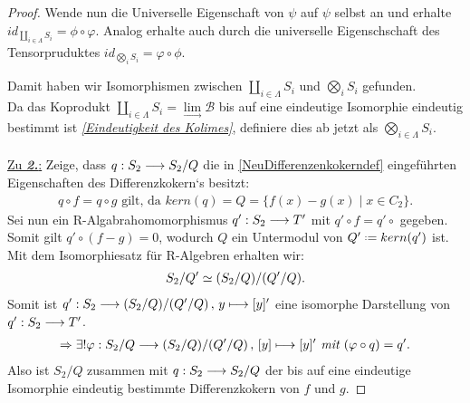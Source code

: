 \documentclass[10pt,a4paper]{report}
\newcommand{\functionfront}[3]{\nolinebreak{#1:#2 \longrightarrow #3}}
\newcommand{\function}[5]{\nolinebreak{#1:#2 \longrightarrow #3 \, , \, #4 \longmapsto #5}}
\newcommand{\colimes}[0]{\lim\limits_{ \longrightarrow }}
\newcommand*{\defeq}{\mathrel{\vcenter{\baselineskip0.5ex \lineskiplimit0pt
                     \hbox{\scriptsize.}\hbox{\scriptsize.}}}%
                     =}
\newcommand{\kernel}[1]{kern(#1)}
\begin{document}
\begin{proof}
Wende nun die Universelle Eigenschaft von $\psi$ auf $\psi$ selbst an und erhalte $id_{\coprod_{i \in \Lambda} S_i} = \phi \circ \varphi$. Analog erhalte auch durch die universelle Eigenschschaft des Tensorpruduktes $id_{\bigotimes_i S_i} = \varphi \circ \phi$.
\begin{center}
\end{center}
Damit haben wir Isomorphismen zwischen $\coprod_{i \in \Lambda} S_i$ und $\bigotimes_i S_i$ gefunden.\\
Da das Koprodukt $\coprod_{i \in \Lambda} S_i = \colimes \mathcal{B}$ bis auf eine eindeutige Isomorphie eindeutig bestimmt ist \textit{\cref{Eindeutigkeit des Kolimes}}, definiere dies ab jetzt als $\bigotimes_{i \in \Lambda} S_i$.\\
\ \\
\underline{Zu \textit{\textbf{2.}}:} Zeige, dass $\functionfront{q}{S_2}{S_2/Q}$ die in \cref{NeuDifferenzenkokerndef} eingeführten Eigenschaften des Differenzkokern`s  besitzt:
\begin{gather*}
q \circ f = q \circ g \text{ gilt, da } \kernel{q} = Q = \lbrace f(x) - g(x)\mid x \in C_2 \rbrace.
\end{gather*}
Sei nun ein R-Algabrahomomorphismus $\functionfront{q'}{S_2}{T'}$ mit $q' \circ f = q' \circ$ gegeben.\\
Somit gilt $q' \circ (f - g) = 0$, wodurch $Q$ ein Untermodul von $Q' \defeq \kernel{q'}$ ist.\\ Mit dem Isomorphiesatz für R-Algebren erhalten wir:
\begin{gather*}
 \nolinebreak{S_2/Q' \simeq (S_2/Q)/(Q'/Q)}.
\end{gather*}
Somit ist $\function{q'}{S_2}{(S_2/Q)/(Q'/Q)}{y}{[y]'}$ eine isomorphe Darstellung von $\functionfront{q'}{S_2}{T'}$.
\begin{gather*}
\Rightarrow \exists ! \function{\varphi}{S_2/Q}{(S_2/Q)/(Q'/Q)}{[y]}{[y]'}\textit{ mit }(\varphi \circ q) = q'.
\end{gather*}
Also ist $S_2/Q$ zusammen mit $\functionfront{q}{S_2}{S_2/Q}$ der bis auf eine eindeutige Isomorphie eindeutig bestimmte Differenzkokern von $f$ und $g$.
\end{proof}
\end{document}
